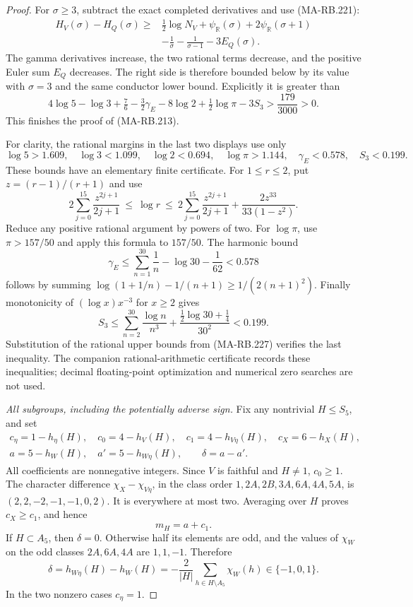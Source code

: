 \begin{proof}
For \(\sigma\ge3\), subtract the exact completed derivatives
and use (MA-RB.221):
\[
 \begin{split}
 H_V(\sigma)-H_Q(\sigma)\ge{}
 &\tfrac12\log N_V+\psi_{\mathbb R}(\sigma)
       +2\psi_{\mathbb R}(\sigma+1)\\
 &-\frac1\sigma-\frac1{\sigma-1}-3E_Q(\sigma).
 \end{split}
 \tag{MA-RB.224}
\]
The gamma derivatives increase, the two rational terms decrease,
and the positive Euler sum \(E_Q\) decreases. The right side is
therefore bounded below by its value with \(\sigma=3\) and
the same conductor lower bound. Explicitly it is greater than
\[
 4\log5-\log3+\tfrac76-\tfrac32\gamma_{\!E}
           -8\log2+\tfrac12\log\pi-3S_3
                     >\frac{179}{3000}>0.
 \tag{MA-RB.225}
\]
This finishes the proof of (MA-RB.213).

For clarity, the rational margins in the last two displays
use only
\[
 \log5>1.609,\quad \log3<1.099,\quad \log2<0.694,
 \quad\log\pi>1.144,\quad\gamma_{\!E}<0.578,
 \quad S_3<0.199.
 \tag{MA-RB.226}
\]
These bounds have an elementary finite certificate. For
\(1\le r\le2\), put \(z=(r-1)/(r+1)\) and use
\[
 2\sum_{j=0}^{15}\frac{z^{2j+1}}{2j+1}
 \ \le\ \log r\ \le\
 2\sum_{j=0}^{15}\frac{z^{2j+1}}{2j+1}
       +\frac{2z^{33}}{33(1-z^2)}.
 \tag{MA-RB.227}
\]
Reduce any positive rational argument by powers of two.
For \(\log\pi\), use \(\pi>157/50\) and apply this formula
to \(157/50\). The harmonic bound
\[
 \gamma_{\!E}\le\sum_{n=1}^{30}\frac1n-\log30-\frac1{62}
                    <0.578
 \tag{MA-RB.228}
\]
follows by summing
\(\log(1+1/n)-1/(n+1)\ge1/(2(n+1)^2)\).
Finally monotonicity of \((\log x)x^{-3}\) for \(x\ge2\)
gives
\[
 S_3\le\sum_{n=2}^{30}\frac{\log n}{n^3}
        +\frac{\tfrac12\log30+\tfrac14}{30^2}<0.199.
 \tag{MA-RB.229}
\]
Substitution of the rational upper bounds from (MA-RB.227)
verifies the last inequality. The companion rational-arithmetic
certificate records these inequalities; decimal floating-point
optimization and numerical zero searches are not used.

\emph{All subgroups, including the potentially adverse sign.}
Fix any nontrivial \(H\le S_5\), and set
\[
 \begin{gathered}
 c_\eta=1-h_\eta(H),\quad c_0=4-h_V(H),\quad
 c_1=4-h_{V\eta}(H),\quad c_X=6-h_X(H),\\
 a=5-h_W(H),\quad a'=5-h_{W\eta}(H),\qquad\delta=a-a'.
 \end{gathered}
 \tag{MA-RB.230}
\]
All coefficients are nonnegative integers. Since \(V\) is
faithful and \(H\ne1\), \(c_0\ge1\).
The character difference \(\chi_X-\chi_{V\eta}\), in the
class order \(1,2A,2B,3A,6A,4A,5A\), is
\((2,2,-2,-1,-1,0,2)\). It is everywhere at most two.
Averaging over \(H\) proves \(c_X\ge c_1\), and hence
\[
                            m_H=a+c_1.
 \tag{MA-RB.231}
\]
If \(H\subset A_5\), then \(\delta=0\).
Otherwise half its elements are odd, and the values of
\(\chi_W\) on the odd classes \(2A,6A,4A\) are
\(1,1,-1\). Therefore
\[
 \delta=h_{W\eta}(H)-h_W(H)
       =-\frac2{|H|}\sum_{h\in H\setminus A_5}\chi_W(h)
                   \in\{-1,0,1\}.
 \tag{MA-RB.232}
\]
In the two nonzero cases \(c_\eta=1\).


\end{proof}
